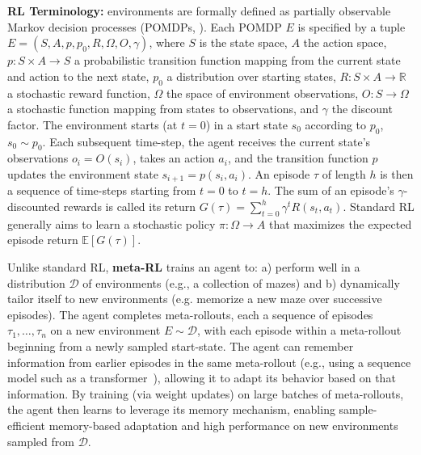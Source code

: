 \documentclass{article}
\begin{document}
\textbf{RL Terminology:} environments are formally defined as partially observable Markov decision processes (POMDPs, \cite{sutton_bach_barto_2018}). Each POMDP \(E\) is specified by a tuple \(E = (S, A, p, p_0, R, \Omega, O, \gamma)\), where \(S\) is the state space, \(A\) the action space, \(p : S \times A \to S\) a probabilistic transition function mapping from the current state and action to the next state, \(p_0\) a distribution over starting states, \(R : S \times A \to \mathbb{R}\) a stochastic reward function, \(\Omega\) the space of environment observations, \(O : S \to \Omega\) a stochastic function mapping from states to observations, and \(\gamma\) the discount factor. The environment starts (at \(t=0\)) in a start state \(s_0\) according to \(p_0\), \(s_0 \sim p_0\). Each subsequent time-step, the agent receives the current state's observations \(o_i = O(s_i)\), takes an action \(a_i\), and the transition function \(p\) updates the environment state \(s_{i+1} = p(s_i, a_i)\). An episode \(\tau\) of length \(h\) is then a sequence of time-steps starting from \(t=0\) to \(t=h\). The sum of an episode's \(\gamma\)-discounted rewards is called its return \(G(\tau) = \sum_{t=0}^{h}\gamma^t R(s_t, a_t)\). Standard RL generally aims to learn a stochastic policy \(\pi : \Omega \to A\) that maximizes the expected episode return \(\mathbb{E}\left[G(\tau)\right]\).


Unlike standard RL, \textbf{meta-RL} trains an agent to: a) perform well in a distribution \(\mathcal{D}\) of environments (e.g., a collection of mazes) and b) 
dynamically tailor itself to new environments (e.g. memorize a new maze over successive episodes).
%
The agent completes meta-rollouts, each a sequence of episodes \(\tau_1, \dots, \tau_n\) on a new environment \(E \sim \mathcal{D}\), with each episode within a meta-rollout beginning from a newly sampled start-state. The agent can remember information from earlier episodes in the same meta-rollout (e.g., using a sequence model such as a transformer~\citep{radford2019language}), allowing it to adapt its behavior based on that information.
By training (via weight updates) on large batches of meta-rollouts, the agent then learns to leverage its memory mechanism, enabling sample-efficient memory-based adaptation and high performance on new environments sampled from \(\mathcal{D}\).
\end{document}
